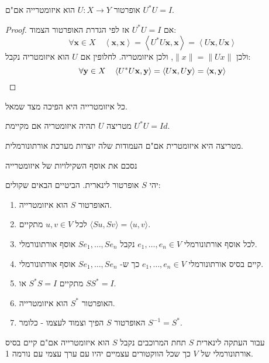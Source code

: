 \documentclass{tstextbook}
\begin{document}
\begin{proposition}
אופרטור \(U:X\to Y\) הוא איזומטרייה אם"ם \(U^{*}U=I\).

\end{proposition}
\begin{proof}
אם \(U^{*}U=I\) אז לפי הגדרת האופרטור הצמוד:
$$\forall\mathbf{x}\in X\quad \left \langle  \mathbf{x},\mathbf{x} \right \rangle =\left \langle  U^{*}U\mathbf{x},\mathbf{x} \right \rangle =\left \langle  U\mathbf{x},U\mathbf{x} \right \rangle $$
ולכן \(\lVert x \rVert=\lVert Ux \rVert\), ולכן איזומטריה. לחלופין אם \(U\) הוא איזומטריה נקבל:
$$\forall{\bf y}\in X\quad \left \langle  U^{*}U{\bf x},{\bf y} \right \rangle =\left \langle  U{\bf x},U{\bf y} \right \rangle =\left \langle  {\bf x},{\bf y} \right \rangle $$

\end{proof}
\begin{corollary}
כל איזומטרייה היא הפיכה מצד שמאל. 

\end{corollary}
\begin{definition}
מטריצה \(U\) תהיה איזומטריה אם מקיימת \(U^{*}U=Id\).

\end{definition}
\begin{proposition}
מטריצה היא איזומטרית אם"ם העמודות שלה יוצרות מערכת אורתונורמלית.

\end{proposition}
נסכם את אוסף השקילויות של איזומטרייה

\begin{proposition}
יהי \(S\) אופרטור לינארית. הביטיים הבאים שקולים:

  \begin{enumerate}
    \item האופרטור \(S\) הוא איזומטרייה. 


    \item לכל \(u, v \in V\) מתקיים \(\langle Su,Sv \rangle=\langle u,v \rangle\). 


    \item לכל אוסף אורתונורמלי \(e_{1},\dots , e_{n}\in V\) נקבל \(Se_{1},\dots,Se_{n}\) אוסף אורתונורמלי. 


    \item קיים בסיס אורתונורמלי \(e_{1},\dots , e_{n}\in V\) כך ש- \(Se_{1},\dots,Se_{n}\) אוסף אורתונורמלי.  


    \item מתקיים \(S^{*}S = I\) או \(S S^{*}=I\). 


    \item האופרטור \(S^{*}\) הוא איזומטרייה. 


    \item האופרטור \(S\) הפיך וצמוד לעצמו - כלומר \(S ^{-1} = S^{*}\). 


  \end{enumerate}
\end{proposition}
\begin{proposition}
עבור העתקה לינארית \(S\) תחת המרוכבים נקבל \(S\) הוא איזומטרייה אם"ם קיים בסיס אורתונורמלי של \(V\) כך שכל הווקטורים עצמיים יהיו עם ערך עצמי עם נורמה 1.

\end{proposition}
\end{document}
